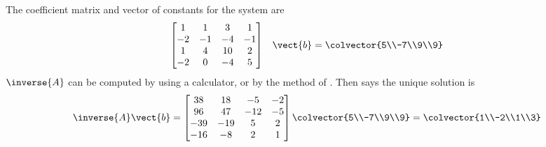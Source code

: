 The coefficient matrix and vector of constants for the system are
%
\begin{align*}
\begin{bmatrix}
1 & 1 & 3 & 1\\ 
-2 & -1 & -4 & -1\\ 
1 & 4 & 10 & 2\\ 
-2 & 0 & -4 & 5
\end{bmatrix}&&
\vect{b}=\colvector{5\\-7\\9\\9}
\end{align*}
%
$\inverse{A}$ can be computed by using a calculator, or by the method of .
Then  says the unique solution is
%
\begin{equation*}
\inverse{A}\vect{b}=
\begin{bmatrix}
38 & 18 & -5 & -2\\ 
96 & 47 & -12 & -5\\ 
-39 & -19 & 5 & 2\\ 
-16 & -8 & 2 & 1
\end{bmatrix}
\colvector{5\\-7\\9\\9}
=
\colvector{1\\-2\\1\\3}
%
\end{equation*}
